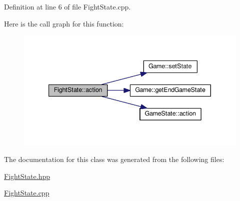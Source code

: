 Definition at line 6 of file Fight\-State.\-cpp.



Here is the call graph for this function\-:
\nopagebreak
\begin{figure}[H]
\begin{center}
\leavevmode
\includegraphics[width=340pt]{class_fight_state_af27ec5d07802ad3fcc7e17c1a6dd9891_cgraph}
\end{center}
\end{figure}




The documentation for this class was generated from the following files\-:\begin{DoxyCompactItemize}
\item 
\hyperlink{_fight_state_8hpp}{Fight\-State.\-hpp}\item 
\hyperlink{_fight_state_8cpp}{Fight\-State.\-cpp}\end{DoxyCompactItemize}
